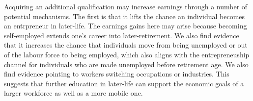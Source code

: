 \documentclass[12pt, a4paper]{article}
\begin{document}
Acquiring an additional qualification may increase earnings through a number of potential mechanisms. The first is that it lifts the chance an individual becomes an entrpreneur in later-life. The earnings gains here may arise because becoming self-employed extends one's career into later-retirement. We also find evidence that it increases the chance that individuals move from being unemployed or out of the labour force to being employed, which also aligns with the entrepreneuship channel for individuals who are made unemployed before retirement age. We also find evidence pointing to workers switching occupations or industries. This suggests that further education in later-life can support the economic goals of a larger workforce as well as a more mobile one.



 







\end{document}

